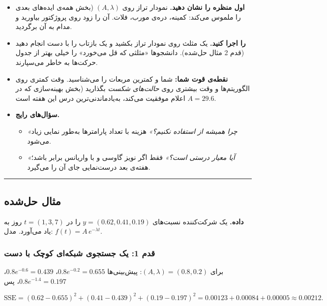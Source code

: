 \begin{itemize}
\tightlist
\item
  \textbf{اول منظره را نشان دهید.} نمودار تراز  روی
  \((A, \lambda)\) (بخش  همه‌ی ایده‌های بعدی را ملموس می‌کند:
  کمینه، دره‌ی مورب، فلات. آن را زود روی پروژکتور بیاورید و مدام به آن
  برگردید.
\item
  \textbf{ را اجرا کنید.} یک مثلث روی نمودار تراز بکشید
  و یک بازتاب  را با دست انجام دهید (قدم 2 مثال حل‌شده).
  دانشجوها «مثلثی که قل می‌خورد» را خیلی بهتر از جدول حرکت‌ها به خاطر
  می‌سپارند.
\item
  \textbf{نقطه‌ی قوت شما:} شما  و کمترین مربعات را
  می‌شناسید. وقت کمتری روی الگوریتم‌ها و وقت بیشتری روی \emph{حالت‌های
  شکست} بگذارید (بخش  بهینه‌سازی که در \(A = 29.6\) اعلام
  موفقیت می‌کند، به‌یادماندنی‌ترین درس این هفته است.
\item
  \textbf{سؤال‌های رایج.}

  \begin{itemize}
  \tightlist
  \item
    \emph{«چرا همیشه از  استفاده نکنیم؟»} هزینه با تعداد
    پارامترها به‌طور نمایی زیاد می‌شود.
  \item
    \emph{«آیا  معیار درستی است؟»} فقط اگر نویز گاوسی و با
    واریانس برابر باشد؛ هفته‌ی بعد درست‌نمایی جای آن را می‌گیرد.
  \end{itemize}
\end{itemize}

\begin{center}\rule{0.5\linewidth}{0.5pt}\end{center}

\subsection{مثال حل‌شده}

\textbf{داده.} یک شرکت‌کننده نسبت‌های \(y = (0.62, 0.41, 0.19)\) را در
\(t = (1, 3, 7)\) روز به یاد می‌آورد. مدل: \(f(t) = A\,e^{-\lambda t}\).

\subsubsection{قدم 1: یک جستجوی شبکه‌ای کوچک با دست}

برای \((A, \lambda) = (0.8, 0.2)\): پیش‌بینی‌ها \(0.8e^{-0.2} = 0.655\)،
\(0.8e^{-0.6} = 0.439\)، \(0.8e^{-1.4} = 0.197\)، پس

\[
\mathrm{SSE} = (0.62 - 0.655)^2 + (0.41 - 0.439)^2 + (0.19 - 0.197)^2 = 0.00123 + 0.00084 + 0.00005 \approx 0.00212.
\]

